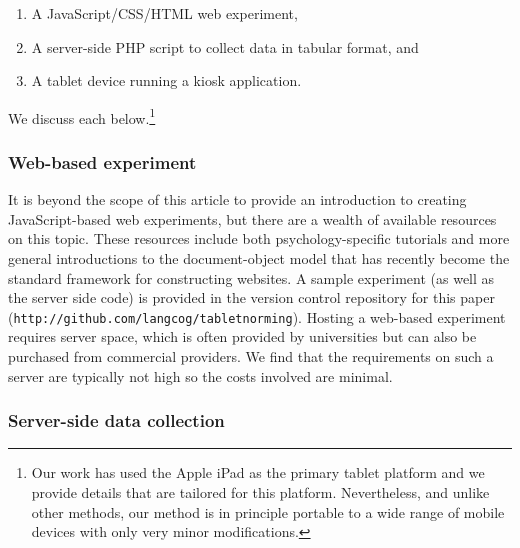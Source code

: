 \documentclass[man,noapacite]{apa2}
\begin{document}
\begin{enumerate}
\item A JavaScript/CSS/HTML web experiment, 
\item A server-side PHP script to collect data in tabular format, and
\item A tablet device running a kiosk application. 
\end{enumerate}

\noindent We discuss each below.\footnote{Our work has used the Apple iPad as the primary tablet platform and we provide details that are tailored for this platform. Nevertheless, and unlike other methods, our method is in principle portable to a wide range of mobile devices with only very minor modifications.}

\subsubsection{Web-based experiment}

It is beyond the scope of this article to provide an introduction to creating JavaScript-based web experiments, but there are a wealth of available resources on this topic. These resources include both psychology-specific tutorials and more general introductions to the document-object model that has recently become the standard framework for constructing websites. A sample experiment (as well as the server side code) is provided in the version control repository for this paper (\texttt{http://github.com/langcog/tablet\textunderscore norming}). Hosting a web-based experiment requires server space, which is often provided by universities but can also be purchased from commercial providers. We find that the requirements on such a server are typically not high so the costs involved are minimal.


\subsubsection{Server-side data collection}
\end{document}
